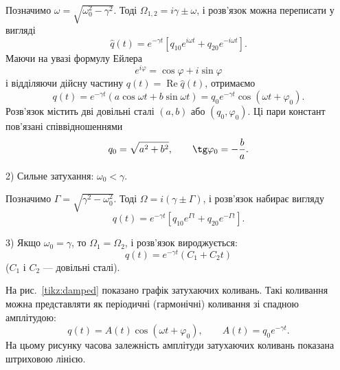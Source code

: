 Позначимо $\omega = \sqrt{\omega_0^2 - \gamma^2}$. Тоді $\Omega_{1,2} = i\gamma \pm \omega$, і розв'язок можна переписати у вигляді
\begin{equation}\label{eq:weak_damping_complex}
	\hat{q}(t) = e^{-\gamma t}\left[q_{10} e^{i\omega t} + q_{20} e^{-i\omega t}\right].
\end{equation}
Маючи на увазі формулу Ейлера
\begin{equation}\label{eq:Euler}
	e^{i\varphi} = \cos\varphi + i\sin\varphi
\end{equation}
і відділяючи дійсну частину $q(t) = \operatorname{Re}\hat{q}(t)$, отримаємо
\begin{equation}\label{eq:weak_damping}
	q(t) = e^{-\gamma t}\left(a\cos\omega t + b\sin\omega t\right) = q_0 e^{-\gamma t}\cos(\omega t + \varphi_0).
\end{equation}
Розв'язок містить дві довільні сталі $(a, b)$ або $(q_0, \varphi_0)$.
Ці пари констант пов'язані співвідношеннями
\begin{equation}\label{eq:constants_relation}
	q_0 = \sqrt{a^2 + b^2}, \qquad \tg\varphi_0 = -\frac{b}{a}.
\end{equation}

2) Сильне затухання: $\omega_0 < \gamma$.

Позначимо $\Gamma = \sqrt{\gamma^2 - \omega_0^2}$. Тоді $\Omega = i(\gamma \pm \Gamma)$, і розв'язок набирає вигляду
\begin{equation}\label{eq:strong_damping}
	q(t) = e^{-\gamma t}\left[q_{10} e^{\Gamma t} + q_{20} e^{-\Gamma t}\right].
\end{equation}

3) Якщо $\omega_0 = \gamma$, то $\Omega_1 = \Omega_2$, і розв'язок вироджується:
\begin{equation}\label{eq:critical_damping}
	q(t) = e^{-\gamma t}\left(C_1 + C_2 t\right)
\end{equation}
($C_1$ і $C_2$ --- довільні сталі).

На рис.~\ref{tikz:damped} показано графік затухаючих коливань. Такі коливання можна представляти як періодичні (гармонічні) коливання зі спадною амплітудою:
\begin{equation}\label{eq:damped_general}
	q(t) = A(t)\cos(\omega t + \varphi_0), \qquad A(t) = q_0 e^{-\gamma t}.
\end{equation}
На цьому рисунку часова залежність амплітуди затухаючих коливань показана штриховою лінією.

